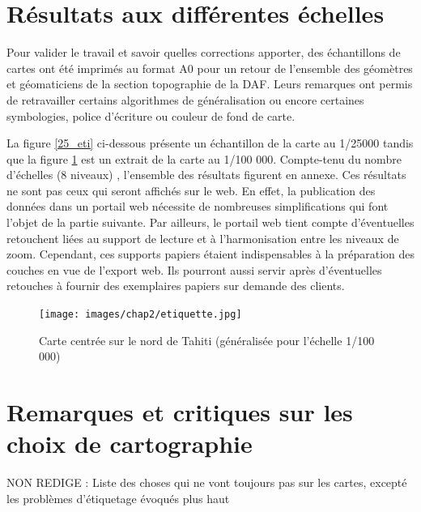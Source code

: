 \section {Résultats aux différentes échelles}

Pour valider le travail et savoir quelles corrections apporter, des échantillons de cartes ont été imprimés au format A0 pour un retour de l'ensemble des géomètres et géomaticiens de la section topographie de la DAF. Leurs remarques ont permis de retravailler certains algorithmes de généralisation ou encore certaines symbologies, police d'écriture ou couleur de fond de carte. 

La figure \ref{25_eti} ci-dessous présente un échantillon de  la carte au 1/25000 tandis que la figure \ref{100} est un extrait de la carte au 1/100 000. Compte-tenu du nombre d'échelles (8 niveaux) , l'ensemble des résultats figurent en annexe. Ces résultats ne sont pas ceux qui seront affichés sur le web. En effet, la publication des données dans un portail web nécessite de nombreuses simplifications qui font l'objet de la partie suivante. Par ailleurs, le portail web tient compte d'éventuelles retouchent liées au support de lecture et à l'harmonisation entre les niveaux de zoom. 
Cependant, ces supports papiers étaient indispensables à la préparation des couches en vue de l'export web. Ils pourront aussi servir après d'éventuelles retouches à fournir des exemplaires papiers sur demande des clients.

\begin{figure}[!h]
\centering
\texttt{[image: images/chap2/etiquette.jpg]}
\caption{Carte centrée sur le nord de Tahiti (généralisée pour l'échelle 1/100 000)}
\label{100}
\end{figure}

\section{Remarques et critiques sur les choix de cartographie}
{\color{magenta} NON REDIGE : Liste des choses qui ne vont toujours pas sur les cartes, excepté les problèmes d'étiquetage évoqués plus haut}
